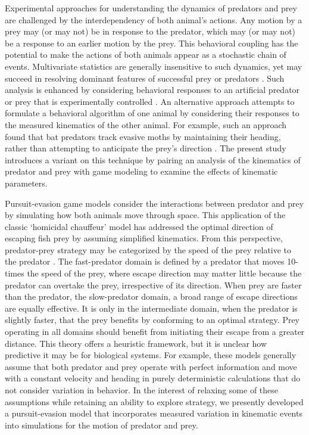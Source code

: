 \documentclass[]{rsos}%
\begin{document}
Experimental approaches for understanding the dynamics of predators and prey are challenged by the interdependency of both animal's actions.
Any motion by a prey may (or may not) be in response to the predator, which may (or may not) be a response to an earlier motion by the prey. 
This behavioral coupling has the potential to make the actions of both animals appear as a stochastic chain of events.
Multivariate statistics are generally insensitive to such dynamics, yet may succeed in resolving dominant features of successful prey \cite{Walker:2005vn} or predators \cite{Wainwright:2001ufa}.
Such analysis is enhanced by considering behavioral responses to an artificial predator or prey that is experimentally controlled \cite{Gabbiani:1999wz,Stewart:2014cma,Heuch:2007kk}.
An alternative approach attempts to formulate a behavioral algorithm of one animal by considering their responses to the measured kinematics of the other animal.
For example, such an approach found that bat predators track evasive moths by maintaining their heading, rather than attempting to anticipate the prey's direction \cite{Ghose:2006dk}. 
The present study introduces a variant on this technique by pairing an analysis of the kinematics of predator and prey with game modeling to examine the effects of kinematic parameters.

Pursuit-evasion game models consider the interactions between predator and prey by simulating how both animals move through space.
This application of the classic `homicidal chauffeur' model \cite{Isaacs:1965uz} has addressed the optimal direction of escaping fish prey \cite{Weihs:1984tb} by assuming simplified kinematics.
From this perspective, predator-prey strategy may be categorized by the speed of the prey relative to the predator \cite{Soto:2015cj}. 
The fast-predator domain is defined by a predator that moves 10-times the speed of the prey, where escape direction may matter little because the predator can overtake the prey, irrespective of its direction.
When prey are faster than the predator, the slow-predator domain, a broad range of escape directions are equally effective.
It is only in the intermediate domain, when the predator is slightly faster, that the prey benefits by conforming to an optimal strategy.
Prey operating in all domains should benefit from initiating their escape from a greater distance.
This theory offers a heuristic framework, but it is unclear how predictive it may be for biological systems. 
For example, these models generally assume that both predator and prey operate with perfect information and move with a constant velocity and heading in purely deterministic calculations that do not consider variation in behavior.
In the interest of relaxing some of these assumptions while retaining an ability to explore strategy, we presently developed a pursuit-evasion model that incorporates measured variation in kinematic events into simulations for the motion of predator and prey. 
\end{document}

